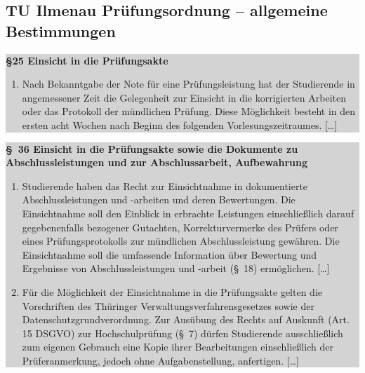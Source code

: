 \documentclass[12pt, a4paper]{article}
\begin{document}
\subsection{TU Ilmenau Prüfungsordnung  – allgemeine Bestimmungen}

\noindent\subitem\colorbox{lightgray}{
    \begin{minipage}[h]{0.9\linewidth}
        \scriptsize %
        \textbf{§25 Einsicht in die Prüfungsakte}
        \begin{enumerate}
            \item Nach Bekanntgabe der Note für eine Prüfungsleistung hat der Studierende in angemessener Zeit die Gelegenheit zur Einsicht in die korrigierten Arbeiten oder das Protokoll der mündlichen Prüfung. Diese Möglichkeit besteht in den ersten acht Wochen nach Beginn des folgenden Vorlesungszeitraumes. […]
        \end{enumerate}
    \end{minipage}
}

\noindent\subitem\colorbox{lightgray}{
    \begin{minipage}[h]{0.9\linewidth}
        \scriptsize %
        \textbf{§ 36 Einsicht in die Prüfungsakte sowie die Dokumente zu Abschlussleistungen und zur Abschlussarbeit, Aufbewahrung}
        \begin{enumerate}
            \item Studierende haben das Recht zur Einsichtnahme in dokumentierte Abschlussleistungen und -arbeiten und deren Bewertungen. Die Einsichtnahme soll den Einblick in erbrachte Leistungen einschließlich darauf gegebenenfalls bezogener Gutachten, Korrekturvermerke des Prüfers oder eines Prüfungsprotokolls zur mündlichen Abschlussleistung gewähren. Die Einsichtnahme soll die umfassende Information über Bewertung und Ergebnisse von Abschlussleistungen und -arbeit (§ 18) ermöglichen. […]
            \item Für die Möglichkeit der Einsichtnahme in die Prüfungsakte gelten die Vorschriften des Thüringer Verwaltungsverfahrensgesetzes sowie der Datenschutzgrundverordnung. Zur Ausübung des Rechts auf Auskunft (Art. 15 DSGVO) zur Hochschulprüfung (§ 7) dürfen Studierende ausschließlich zum eigenen Gebrauch eine Kopie ihrer Bearbeitungen einschließlich der Prüferanmerkung, jedoch ohne Aufgabenstellung, anfertigen. […]
        \end{enumerate}
    \end{minipage}
}
\end{document}
